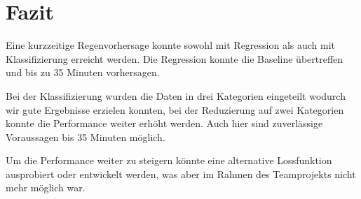 \section{Fazit}
Eine kurzzeitige Regenvorhersage konnte sowohl mit Regression als auch mit Klassifizierung erreicht werden. Die Regression konnte die Baseline übertreffen und bis zu 35 Minuten vorhersagen.

Bei der Klassifizierung wurden die Daten in drei Kategorien eingeteilt wodurch wir gute Ergebnisse erzielen konnten, bei der Reduzierung auf zwei Kategorien konnte die Performance weiter erhöht werden. Auch hier sind zuverlässige Voraussagen bis 35 Minuten möglich.

Um die Performance weiter zu steigern könnte eine alternative Lossfunktion ausprobiert oder entwickelt werden, was aber im Rahmen des Teamprojekts nicht mehr möglich war.
